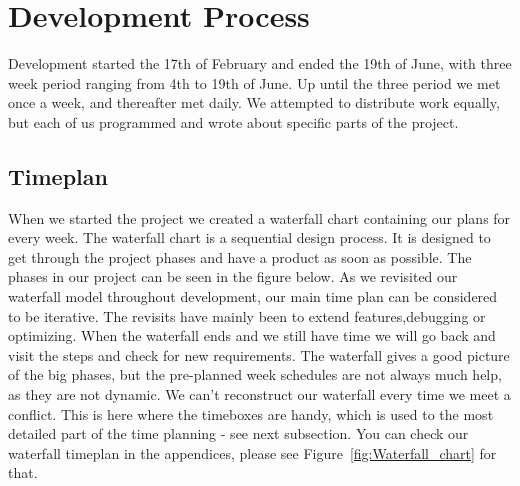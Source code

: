 \chapter{Development Process} %
Development started the 17th of February and ended the 19th of June, with three week period ranging from 4th to 19th of June. Up until the three period we met once a week, and thereafter met daily. We attempted to distribute work equally, but each of us programmed and wrote about specific parts of the project.

\section{Timeplan} %
When we started the project we created a waterfall chart containing our plans for every week. The waterfall chart is a sequential design process. It is designed to get through the project phases and have a product as soon as possible. The phases in our project can be seen in the figure below.
\newline
As we revisited our waterfall model throughout development, our main time plan can be considered to be iterative. The revisits have mainly been to extend features,debugging or optimizing.
\newline
When the waterfall ends and we still have time we will go back and visit the steps and check for new requirements.
\newline
The waterfall gives a good picture of the big phases, but the pre-planned week schedules are not always much help, as they are not dynamic. We can't reconstruct our waterfall every time we meet a conflict. This is here where the timeboxes are handy, which is used to the most detailed part of the time planning - see next subsection. You can check our waterfall timeplan in the appendices, please see Figure~\ref{fig:Waterfall_chart} for that.
